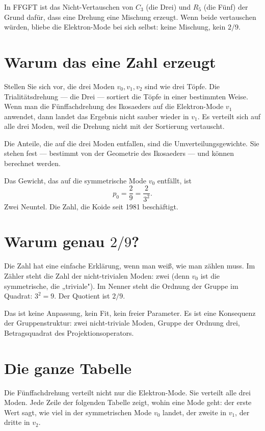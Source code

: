 \documentclass[12pt,oneside]{book}
\begin{document}
In FFGFT ist das Nicht-Vertauschen von $C_3$ (die Drei) und $R_5$ (die Fünf) der Grund dafür, dass eine Drehung eine Mischung erzeugt. Wenn beide vertauschen würden, bliebe die Elektron-Mode bei sich selbst: keine Mischung, kein $2/9$.

\section{Warum das eine Zahl erzeugt}

Stellen Sie sich vor, die drei Moden $v_0, v_1, v_2$ sind wie drei Töpfe. Die Trialitätsdrehung — die Drei — sortiert die Töpfe in einer bestimmten Weise. Wenn man die Fünffachdrehung des Ikosaeders auf die Elektron-Mode $v_1$ anwendet, dann landet das Ergebnis nicht sauber wieder in $v_1$. Es verteilt sich auf alle drei Moden, weil die Drehung nicht mit der Sortierung vertauscht.

Die Anteile, die auf die drei Moden entfallen, sind die Umverteilungsgewichte. Sie stehen fest — bestimmt von der Geometrie des Ikosaeders — und können berechnet werden.

Das Gewicht, das auf die symmetrische Mode $v_0$ entfällt, ist
\[
p_0 = \frac{2}{9} = \frac{2}{3^2}.
\]
Zwei Neuntel. Die Zahl, die Koide seit 1981 beschäftigt.

\section{Warum genau $2/9$?}

Die Zahl hat eine einfache Erklärung, wenn man weiß, wie man zählen muss. Im Zähler steht die Zahl der nicht-trivialen Moden: zwei (denn $v_0$ ist die symmetrische, die „triviale"). Im Nenner steht die Ordnung der Gruppe im Quadrat: $3^2 = 9$. Der Quotient ist $2/9$.

Das ist keine Anpassung, kein Fit, kein freier Parameter. Es ist eine Konsequenz der Gruppenstruktur: zwei nicht-triviale Moden, Gruppe der Ordnung drei, Betragsquadrat des Projektionsoperators.

\section{Die ganze Tabelle}

Die Fünffachdrehung verteilt nicht nur die Elektron-Mode. Sie verteilt alle drei Moden. Jede Zeile der folgenden Tabelle zeigt, wohin eine Mode geht: der erste Wert sagt, wie viel in der symmetrischen Mode $v_0$ landet, der zweite in $v_1$, der dritte in $v_2$.
\end{document}
